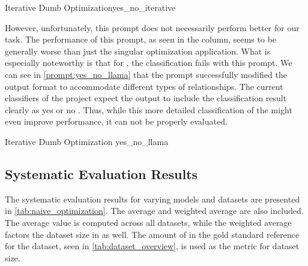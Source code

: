 \begin{prompt}{\KISS Iterative Dumb Optimization}{yes_no_iterative}
    \\
    
\end{prompt}

However, unfortunately, this prompt does not necessarily perform better for our task.
The performance of this prompt, as seen in the  column, seems to be generally worse than just the singular optimization application.
What is especially noteworthy is that for \llama, the classification fails with this prompt.
We can see in \autoref{prompt:yes_no_llama} that the prompt successfully modified the output format to accommodate different types of relationships.
The current classifiers of the \LiSSA project expect the \LLM output to include the classification result clearly as \textquotesingle yes \textquotesingle or \textquotesingle no \textquotesingle.
Thus, while this more detailed classification of the \LLM might even improve performance, it can not be properly evaluated.

\begin{prompt}{\KISS Iterative Dumb Optimization \llama}{yes_no_llama}
    \\
    
\end{prompt}

\subsection{Systematic Evaluation Results}
\label{subsec:Evaluation:naive_optimization:systematic-evaluation-results}

The systematic evaluation results for varying models and datasets are presented in \autoref{tab:naive_optimization}.
The average and weighted average are also included.
The average value is computed across all datasets, while the weighted average factors the dataset size in as well.
The amount of \TLs in the gold standard reference for the dataset, seen in \autoref{tab:dataset_overview}, is used as the metric for dataset size.

\begin{table}
    \centering
    \renewcommand{\arraystretch}{1.4}
    
    \renewcommand{\arraystretch}{1}
    \caption{Naive prompt optimization approach prompting the model to optimize the classification prompt}
    \label{tab:naive_optimization}
\end{table}


